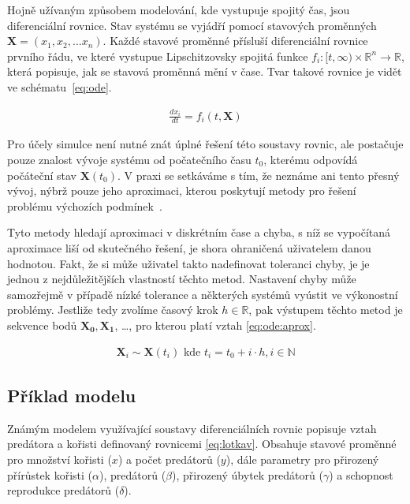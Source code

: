 Hojně užívaným způsobem modelování, kde vystupuje spojitý čas, jsou diferenciální rovnice.
Stav systému se vyjádří pomocí stavových pro\-měn\-ných $\mathbf{X} = (\mathit{x_1}, \mathit{x_2}, \dots \mathit{x_n})$.
Každé stavové proměnné přísluší diferenciální rovni\-ce prvního řádu, ve které vystupue
Lipschitzovsky spojitá \cite[str. 149 -- 163]{eriksson2004} funkce
$f_i: [t, \infty) \times \mathbb{R}^n \rightarrow \mathbb{R}$, která popisuje,
jak se stavová proměnná mění v čase. Tvar takové rovnice je vidět ve sché\-ma\-tu~\ref{eq:ode}.

\begin{align}\label{eq:ode}
\frac{d\mathit{x_i}}{dt} = f_i(t, \mathbf{X})
\end{align}

Pro účely simulce není nutné znát úplné řešení této soustavy rovnic, ale postačuje pouze znalost
vývoje systému od počatečního času $t_0$, kterému odpovídá počáteční stav $\mathbf{X}(t_0)$.
V praxi se setkáváme s tím, že neznáme ani tento přesný vývoj, nýbrž pouze jeho aproximaci,
kterou poskytují metody pro řešení problému výchozích podmínek~\cite{iserles1996}.

Tyto metody hledají aproximaci v diskrétním čase a chyba, s níž se vy\-po\-čí\-ta\-ná
aproximace liší od skutečného řešení, je shora ohraničená uživatelem danou hodnotou.
Fakt, že si může uživatel takto nadefinovat toleranci chyby, je je jednou z nejdůležitějších
vlastností těchto metod. Nastavení chyby může samozřejmě v případě nízké tolerance
a některých systémů vyústit ve výkonostní problémy. Jestliže tedy zvolíme časový
krok $h \in \mathbb{R}$, pak výstupem těchto metod je sekvence bodů $\mathbf{X_0}, \mathbf{X_1}$, \ldots,
pro kterou platí vztah \ref{eq:ode:aprox}.

\begin{align}\label{eq:ode:aprox}
\mathbf{X}_i \sim \mathbf{X}(t_i) \textrm{ kde } t_i = t_0 + i \cdot h, i \in \mathbb{N}
\end{align}


\subsection{Příklad modelu}\label{section:lotkav}

Známým modelem využívající soustavy diferenciálních rovnic popisuje vztah predátora
a kořisti \cite{lotka1925} definovaný rovnicemi \ref{eq:lotkav}. Obsahuje stavové pro\-měn\-né
pro množství kořisti ($x$) a počet predátorů ($y$), dále parametry pro přirozený
přírůstek kořisti ($\alpha$),  predátorů ($\beta$), přirozený úbytek
predátorů ($\gamma$) a schopnost reprodukce predátorů ($\delta$).

